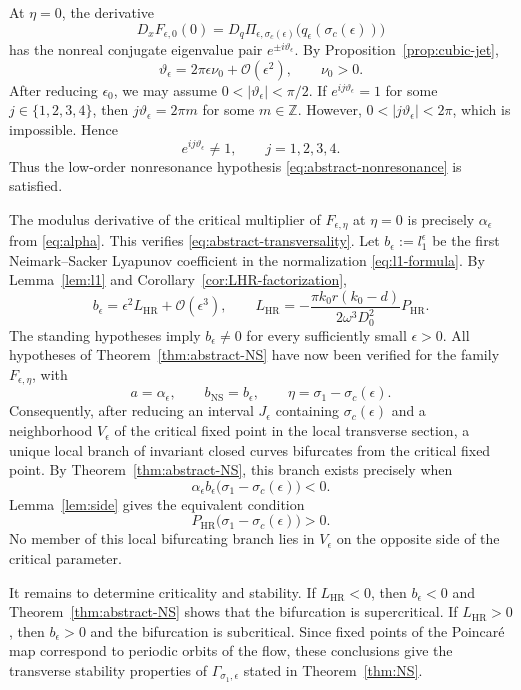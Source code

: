 \documentclass[11pt]{amsart}
\theoremstyle{remark}
\newcommand{\cO}{\mathcal{O}}
\newcommand{\PHR}{P_{\mathrm{HR}}}
\newcommand{\LHR}{L_{\mathrm{HR}}}
\begin{document}
At \(\eta=0\), the derivative
\[
 D_xF_{\epsilon,0}(0)
=D_q\Pi_{\epsilon,\sigma_c(\epsilon)}
\bigl(q_\epsilon(\sigma_c(\epsilon))\bigr)
\]
has the nonreal conjugate eigenvalue pair
\(e^{\pm i\vartheta_\epsilon}\).  By
Proposition~\ref{prop:cubic-jet},
\[
 \vartheta_\epsilon=2\pi\epsilon\nu_0+\cO(\epsilon^2),
 \qquad \nu_0>0.
\]
After reducing \(\epsilon_0\), we may assume
\(0<|\vartheta_\epsilon|<\pi/2\).  If
\(e^{ij\vartheta_\epsilon}=1\) for some \(j\in\{1,2,3,4\}\), then
\(j\vartheta_\epsilon=2\pi m\) for some \(m\in\mathbb{Z}\).  However,
\(0<|j\vartheta_\epsilon|<2\pi\), which is impossible.  Hence
\[
 e^{ij\vartheta_\epsilon}\ne1,\qquad j=1,2,3,4.
\]
Thus the low-order nonresonance hypothesis
\eqref{eq:abstract-nonresonance} is satisfied.

The modulus derivative of the critical multiplier of \(F_{\epsilon,\eta}\)
at \(\eta=0\) is precisely \(\alpha_\epsilon\) from \eqref{eq:alpha}.
This verifies \eqref{eq:abstract-transversality}.  Let
\(b_\epsilon:=l_1^\epsilon\) be the first Neimark--Sacker Lyapunov
coefficient in the normalization \eqref{eq:l1-formula}.  By
Lemma~\ref{lem:l1} and Corollary~\ref{cor:LHR-factorization},
\[
 b_\epsilon=\epsilon^2\LHR+\cO(\epsilon^3),
 \qquad
 \LHR=-\frac{\pi k_0r(k_0-d)}{2\omega^3D_0^2}\PHR.
\]
The standing hypotheses imply \(b_\epsilon\ne0\) for every sufficiently
small \(\epsilon>0\).  All hypotheses of
Theorem~\ref{thm:abstract-NS} have now been verified for the family
\(F_{\epsilon,\eta}\), with
\[
 a=\alpha_\epsilon,\qquad b_{\mathrm{NS}}=b_\epsilon,\qquad
 \eta=\sigma_1-\sigma_c(\epsilon).
\]
Consequently, after reducing an interval \(J_\epsilon\) containing
\(\sigma_c(\epsilon)\) and a neighborhood \(V_\epsilon\) of the critical
fixed point in the local transverse section, a unique local branch of
invariant closed curves bifurcates from the critical fixed point.  By
Theorem~\ref{thm:abstract-NS}, this branch exists precisely when
\[
 \alpha_\epsilon b_\epsilon
\bigl(\sigma_1-\sigma_c(\epsilon)\bigr)<0.
\]
Lemma~\ref{lem:side} gives the equivalent condition
\[
 \PHR\bigl(\sigma_1-\sigma_c(\epsilon)\bigr)>0.
\]
No member of this local bifurcating branch lies in \(V_\epsilon\) on the
opposite side of the critical parameter.

It remains to determine criticality and stability.  If \(\LHR<0\), then
\(b_\epsilon<0\) and Theorem~\ref{thm:abstract-NS} shows that the bifurcation
is supercritical.  If \(\LHR>0\), then \(b_\epsilon>0\) and the bifurcation
is subcritical.  Since fixed points of the Poincar\'e map correspond to
periodic orbits of the flow, these conclusions give the transverse stability
properties of \(\Gamma_{\sigma_1,\epsilon}\) stated in
Theorem~\ref{thm:NS}.
\end{document}
